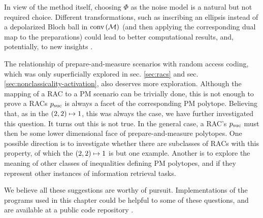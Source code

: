         In view of the method itself, choosing $\Phi$ as the noise model is a natural but not required choice. Different transformations, such as inscribing an ellipsis instead of a depolarized Bloch ball in $\text{conv} \left( \mathcal{M} \right)$ (and then applying the corresponding dual map to the preparations) could lead to better computational results, and, potentially, to new insights \cite{fillettaz_algorithmic_2018}.

		The relationship of prepare-and-measure scenarios with random access coding, which was only superficially explored in sec. \ref{sec:racs} and sec. \ref{sec:nonclassicality-activation}, also deserves more exploration. Although the mapping of a RAC to a PM scenario can be trivially done, this is not enough to prove a RACs $p_{\text{suc}}$ is always a facet of the corresponding PM polytope. Believing that, as in the $\left( 2, 2 \right) \mapsto 1$, this was always the case, we have further investigated this question. It turns out this is not true. In the general case, a RAC's $p_{\text{suc}}$ must then be some lower dimensional face of prepare-and-measure polytopes. One possible direction is to investigate whether there are subclasses of RACs with this property, of which the $\left( 2, 2 \right) \mapsto 1$ is but one example. Another is to explore the meaning of other classes of inequalities defining PM polytopes, and if they represent other instances of information retrieval tasks.

        We believe all these suggestions are worthy of pursuit. Implementations of the programs used in this chapter could be helpful to some of these questions, and are available at a public code repository \cite{classicality_repository}.
